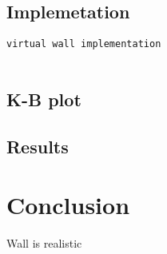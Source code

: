 \documentclass[11pt,a4paper,oneside,notitlepage]{article}
\begin{document}
\subsection{Implemetation}
\begin{lstlisting}[caption=Hall sensor running mean implementation,label=hall_mean]
  virtual wall implementation


\end{lstlisting}
\subsection{K-B plot}

\subsection{Results}


\section{Conclusion}
Wall is realistic
\end{document}
